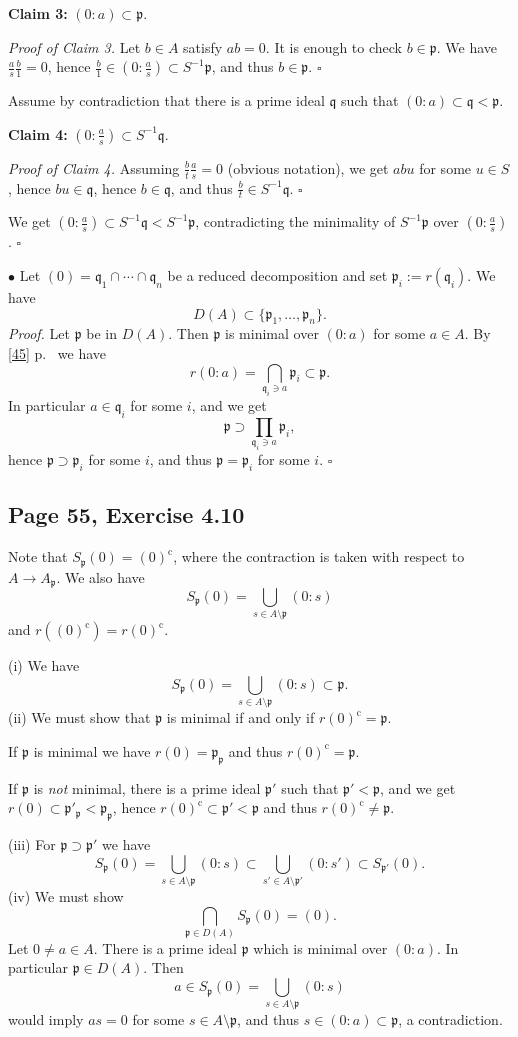 \documentclass[parskip=half,fontsize=12pt]{scrartcl}%
\newcommand{\oo}{\operatorname}\newcommand{\ooo}{\operatorname*}
\newcommand{\mf}{\mathfrak}
\newcommand{\ppp}{\mf p}
\newcommand{\qqq}{\mf q}
\newcommand{\bu}{\bullet}
\begin{document}
\textbf{Claim 3:} $(0:a)\subset\ppp$.

\emph{Proof of Claim 3.} Let $b\in A$ satisfy $ab=0$. It is enough to check $b\in\ppp$. We have $\frac as\frac b1=0$, hence $\frac b1\in(0:\frac as)\subset S^{-1}\ppp$, and thus $b\in\ppp$. $\square$

Assume by contradiction that there is a prime ideal $\qqq$ such that $(0:a)\subset\qqq<\ppp$. 

\textbf{Claim 4:} $(0:\frac as)\subset S^{-1}\qqq$.

\emph{Proof of Claim 4.} Assuming $\frac bt\frac as=0$ (obvious notation), we get $abu$ for some $u\in S$, hence $bu\in\qqq$, hence $b\in\qqq$, and thus $\frac bt\in S^{-1}\qqq$. $\square$ 

We get $(0:\frac as)\subset S^{-1}\qqq<S^{-1}\ppp$, contradicting the minimality of $S^{-1}\ppp$ over $(0:\frac as)$. %
$\square$

$\bu$ Let $(0)=\qqq_1\cap\cdots\cap\qqq_n$ be a reduced decomposition and set $\ppp_i:=r(\qqq_i)$. We have 
$$
D(A)\subset\{\ppp_1,\dots,\ppp_n\}.
$$ 
\emph{Proof.} Let $\ppp$ be in $D(A)$. Then $\ppp$ is minimal over $(0:a)$ for some $a\in A$. By \eqref{45} p.~\pageref{45} we have 
$$
r(0:a)=\bigcap_{\qqq_i\ni a}\ppp_i\subset\ppp.
$$ 
In particular $a\in\qqq_i$ for some $i$, and we get 
$$
\ppp\supset\prod_{\qqq_i\ni a}\ppp_i,
$$ 
hence $\ppp\supset\ppp_i$ for some $i$, and thus $\ppp=\ppp_i$ for some $i$. $\square$

\subsection{Page 55, Exercise 4.10}%

Note that $S_\ppp(0)=(0)^{\oo c}$, where the contraction is taken with respect to $A\to A_\ppp$. We also have 
$$
S_\ppp(0)=\bigcup_{s\in A\setminus\ppp}(0:s)
$$ 
and $r((0)^{\oo c})=r(0)^{\oo c}$.

(i) We have 
$$
S_\ppp(0)=\bigcup_{s\in A\setminus\ppp}(0:s)\subset\ppp.
$$
(ii) We must show that $\ppp$ is minimal if and only if $r(0)^{\oo c}=\ppp$. 

If $\ppp$ is minimal we have $r(0)=\ppp_\ppp$ and thus $r(0)^{\oo c}=\ppp$. 

If $\ppp$ is \emph{not} minimal, there is a prime ideal $\ppp'$ such that $\ppp'<\ppp$, and we get $r(0)\subset\ppp'_\ppp<\ppp_\ppp$, hence $r(0)^{\oo c}\subset\ppp'<\ppp$ and thus $r(0)^{\oo c}\ne\ppp$.

(iii) For $\ppp\supset\ppp'$ we have 
$$
S_\ppp(0)=\bigcup_{s\in A\setminus\ppp}(0:s)\subset\bigcup_{s'\in A\setminus\ppp'}(0:s')\subset S_{\ppp'}(0).
$$
(iv) We must show 
$$
\bigcap_{\ppp\in D(A)}S_\ppp(0)=(0).
$$ 
Let $0\ne a\in A$. There is a prime ideal $\ppp$ which is minimal over $(0:a)$. In particular $\ppp\in D(A)$. Then 
$$
a\in S_\ppp(0)=\bigcup_{s\in A\setminus\ppp}(0:s)
$$ 
would imply $as=0$ for some $s\in A\setminus\ppp$, and thus $s\in(0:a)\subset\ppp$, a contradiction.
\end{document}
